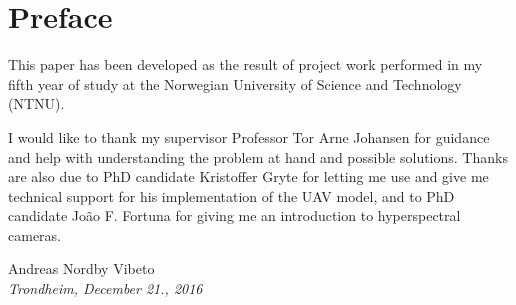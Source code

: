 \section*{Preface}

\vspace{2cm}

This paper has been developed as the result of project work performed in my fifth year of study at the Norwegian University of Science and Technology (NTNU).

I would like to thank my supervisor Professor Tor Arne Johansen for guidance and help with understanding the problem at hand and possible solutions. Thanks are also due to PhD candidate Kristoffer Gryte for letting me use and give me technical support for his implementation of the UAV model, and to PhD candidate João F. Fortuna for giving me an introduction to hyperspectral cameras.

\vspace{2cm}

\begin{center}
	Andreas Nordby Vibeto \\
	\emph{Trondheim, December 21., 2016}
\end{center}